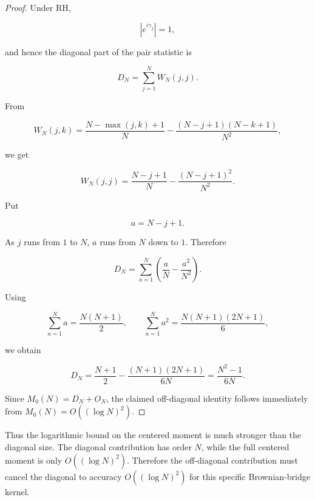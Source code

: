 \documentclass[11pt]{amsart}
\numberwithin{equation}{section}
\theoremstyle{plain}
\theoremstyle{definition}
\theoremstyle{remark}
\begin{document}
\begin{proof}
Under RH,

\begin{equation}
|e^{i\gamma_j}|=1,
\end{equation}

and hence the diagonal part of the pair statistic is

\begin{equation}
D_N
=
\sum_{j=1}^{N}W_N(j,j).
\end{equation}

From

\begin{equation}
W_N(j,k)
=
\frac{N-\max(j,k)+1}{N}
-
\frac{(N-j+1)(N-k+1)}{N^2},
\end{equation}

we get

\begin{equation}
W_N(j,j)
=
\frac{N-j+1}{N}
-
\frac{(N-j+1)^2}{N^2}.
\end{equation}

Put

\begin{equation}
a=N-j+1.
\end{equation}

As \(j\) runs from \(1\) to \(N\), \(a\) runs from \(N\) down to \(1\).
Therefore

\begin{equation}
D_N
=
\sum_{a=1}^{N}
\left(
\frac{a}{N}
-
\frac{a^2}{N^2}
\right).
\end{equation}

Using

\begin{equation}
\sum_{a=1}^{N}a=\frac{N(N+1)}2,
\qquad
\sum_{a=1}^{N}a^2=\frac{N(N+1)(2N+1)}6,
\end{equation}

we obtain

\begin{equation}
D_N
=
\frac{N+1}{2}
-
\frac{(N+1)(2N+1)}{6N}
=
\frac{N^2-1}{6N}.
\end{equation}

Since \(M_0(N)=D_N+O_N\), the claimed off-diagonal identity follows
immediately from \(M_0(N)=O((\log N)^2)\).
\end{proof}

Thus the logarithmic bound on the centered moment is much stronger than
the diagonal size. The diagonal contribution has order \(N\), while the
full centered moment is only \(O((\log N)^2)\). Therefore the
off-diagonal contribution must cancel the diagonal to accuracy
\(O((\log N)^2)\) for this specific Brownian-bridge kernel.
\end{document}
